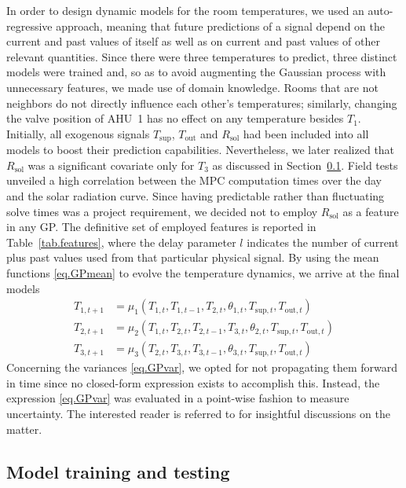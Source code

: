 In order to design dynamic models for the room temperatures, we used an auto-regressive approach, meaning that future predictions of a signal depend on the current and past values of itself as well as on current and past values of other relevant quantities. Since there were three temperatures to predict, three distinct models were trained and, so as to avoid augmenting the Gaussian process with unnecessary features, we made use of domain knowledge. Rooms that are not neighbors do not directly influence each other's temperatures; similarly, changing the valve position of AHU~1 has no effect on any temperature besides $T_1$. Initially, all exogenous signals $T_\text{sup}$, $T_\text{out}$ and $R_\text{sol}$ had been included into all models to boost their prediction capabilities. Nevertheless, we later realized that $R_\text{sol}$ was a significant covariate only for $T_3$ as discussed in Section~\ref{sec.ModelTrainingAndTesting}. Field tests unveiled a high correlation between the MPC computation times over the day and the solar radiation curve. Since having predictable rather than fluctuating solve times was a project requirement, we decided not to employ $R_\text{sol}$ as a feature in any GP. The definitive set of employed features is reported in Table~\ref{tab.features}, where the delay parameter $l$ indicates the number of current plus past values used from that particular physical signal. By using the mean functions \eqref{eq.GPmean} to evolve the temperature dynamics, we arrive at the final models
\begin{subequations}
	\begin{align}
		T_{1,t+1} &= \mu_{1}(T_{1,t}, T_{1,t-1}, T_{2,t}, \theta_{1,t},T_{\text{sup},t},T_{\text{out},t}) \\
		T_{2,t+1} &= \mu_{2}(T_{1,t}, T_{2,t}, T_{2,t-1}, T_{3,t}, \theta_{2,t},T_{\text{sup},t},T_{\text{out},t}) \\
		T_{3,t+1} &= \mu_{3}(T_{2,t}, T_{3,t}, T_{3,t-1}, \theta_{3,t},T_{\text{sup},t},T_{\text{out},t}) 
	\end{align}
	\label{eq.GPmodels}
\end{subequations}
Concerning the variances \eqref{eq.GPvar}, we opted for not propagating them forward in time since no closed-form expression exists to accomplish this. Instead, the expression \eqref{eq.GPvar} was evaluated in a point-wise fashion to measure uncertainty. The interested reader is referred to \cite{girard2004approximate,mchutchon2011gaussian} for insightful discussions on the matter.

\subsection{Model training and testing}
\label{sec.ModelTrainingAndTesting}

